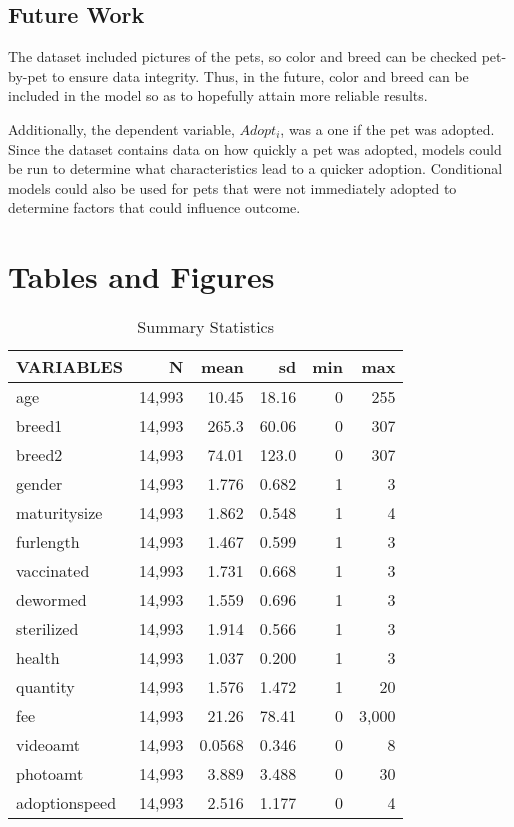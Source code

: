 \documentclass[12pt]{article}
\begin{document}
		\subsection{Future Work}
		The dataset included pictures of the pets, so color and breed can be checked pet-by-pet to ensure data integrity. Thus, in the future, color and breed can be included in the model so as to hopefully attain more reliable results. 
		
		Additionally, the dependent variable, $ Adopt_i $, was a one if the pet was adopted. Since the dataset contains data on how quickly a pet was adopted, models could be run to determine what characteristics lead to a quicker adoption. Conditional models could also be used for pets that were not immediately adopted to determine factors that could influence outcome. 
		
	\newpage
		\printbibliography
		
	\section{Tables and Figures}
	
		\begin{table}[h]
		\centering
		\caption{Summary Statistics}
		\begin{tabular}{lrrrrr} \hline
			VARIABLES & N & mean & sd & min & max \\ \hline
			age & 14,993 & 10.45 & 18.16 & 0 & 255 \\
			breed1 & 14,993 & 265.3 & 60.06 & 0 & 307 \\
			breed2 & 14,993 & 74.01 & 123.0 & 0 & 307 \\
			gender & 14,993 & 1.776 & 0.682 & 1 & 3 \\
			maturitysize & 14,993 & 1.862 & 0.548 & 1 & 4 \\
			furlength & 14,993 & 1.467 & 0.599 & 1 & 3 \\
			vaccinated & 14,993 & 1.731 & 0.668 & 1 & 3 \\
			dewormed & 14,993 & 1.559 & 0.696 & 1 & 3 \\
			sterilized & 14,993 & 1.914 & 0.566 & 1 & 3 \\
			health & 14,993 & 1.037 & 0.200 & 1 & 3 \\
			quantity & 14,993 & 1.576 & 1.472 & 1 & 20 \\
			fee & 14,993 & 21.26 & 78.41 & 0 & 3,000 \\
			videoamt & 14,993 & 0.0568 & 0.346 & 0 & 8 \\
			photoamt & 14,993 & 3.889 & 3.488 & 0 & 30 \\
			adoptionspeed & 14,993 & 2.516 & 1.177 & 0 & 4 \\
			 \hline
		\end{tabular}
		\label{table:1}
	\end{table}
\end{document}
